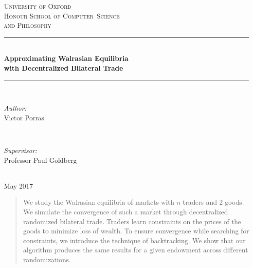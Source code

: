 \documentclass[12pt,a4paper,titlepage]{article}
\begin{document}
\begin{titlepage}

\newcommand{\HRule}{\rule{\linewidth}{0.5mm}} %

\center %
 
\textsc{\LARGE University of Oxford}\\[1.5cm] %
\textsc{\LARGE Honour School of Computer~Science \\[0.2cm] and Philosophy}\\[0.5cm] %

\HRule \\[0.4cm]
\textbf{\LARGE Approximating Walrasian Equilibria} \\[0.3cm]
\textbf{\LARGE with Decentralized Bilateral Trade}\\[0.1cm]
\HRule \\[2cm]
 
\begin{minipage}{0.45\textwidth}
\begin{flushleft} \Large
\emph{Author:}\\
Victor Porras %
\end{flushleft}
\end{minipage}
~
\begin{minipage}{0.45\textwidth}
\begin{flushright} \Large
\emph{Supervisor:} \\
Professor Paul Goldberg %
\end{flushright}
\end{minipage}\\[2cm]

{\Large {May 2017}}\\[2cm]

 

\vfill %

\end{titlepage}

\begin{abstract}
  We study the Walrasian equilibria of markets with $n$ traders and 2 goods.
  We simulate the convergence of such a market through decentralized randomized bilateral trade.
  Traders learn constraints on the prices of the goods to minimize loss of wealth.
  To ensure convergence while searching for constraints, we introduce the technique of backtracking.
  We show that our algorithm produces the same results for a given endowment across different randomizations.
\end{abstract}
\end{document}
